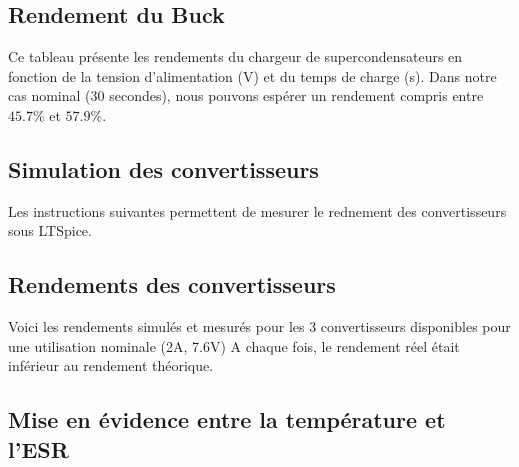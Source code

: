 
\subsection{Rendement du Buck}


Ce tableau présente les rendements du chargeur de supercondensateurs en fonction de la tension d'alimentation (V) et du temps de charge (s).
Dans notre cas nominal (30 secondes), nous pouvons espérer un rendement compris entre $45.7\%$ et $57.9\%$.



\subsection{Simulation des convertisseurs}
\label{meas}

Les instructions suivantes permettent de mesurer le rednement des convertisseurs sous LTSpice.


\subsection{Rendements des convertisseurs}

Voici les rendements simulés et mesurés pour les 3 convertisseurs disponibles pour une utilisation nominale (2A, 7.6V)
A chaque fois, le rendement réel était inférieur au rendement théorique.






\subsection{Mise en évidence entre la température et l'ESR}

